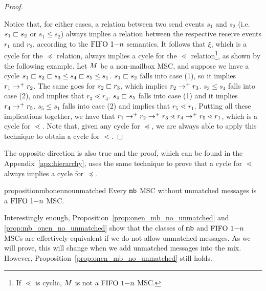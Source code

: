 \begin{proof}
\begin{enumerate}
\end{enumerate}
Notice that, for either cases, a relation between two send events $s_1$ and $s_2$ (i.e. $s_1 \sqsubset s_2$ or $s_1 \le s_2$) always implies a relation between the respective receive events $r_1$ and $r_2$, according to the $\text{FIFO } 1\mathsf{-}n$ semantics. It follows that $\xi$, which is a cycle for the $\preceq$ relation, always implies a cycle for the $\lessdot$ relation\footnote{If $\lessdot$ is cyclic, $M$ is not a $\text{FIFO } 1\mathsf{-}n$ MSC.}, as shown by the following example. Let $M$ be a non-mailbox MSC, and suppose we have a cycle $s_1 \sqsubset s_2 \sqsubset s_3 \le s_4 \sqsubset s_5 \le s_1$. $s_1 \sqsubset s_2$ falls into case (1), so it implies $r_1 \to^+ r_2$. The same goes for $s_2 \sqsubset r_3$, which implies $r_2 \to^+ r_3$. $s_3 \le s_4$ falls into case (2), and implies that $r_3 \lessdot r_4$. $s_4 \sqsubset s_5$ falls into case (1) and it implies $r_4 \to^+ r_5$. $s_5 \le s_1$ falls into case (2) and implies that $r_5 \lessdot r_1$. Putting all these implications together, we have that $r_1 \to^+ r_2 \to^+ r_3 \lessdot r_4 \to^+ r_5 \lessdot r_1$, which is a cycle for $\lessdot$. Note that, given any cycle for $\preceq$, we are always able to apply this technique to obtain a cycle for $\lessdot$.
\end{proof}

The opposite direction is also true and the proof, which can be found in the Appendix~\ref{apx:hierarchy}, uses the same technique to prove that a cycle for $\lessdot$ always implies a cycle for $\preceq$.

\begin{restatable}{proposition}{mbonennounmatched} 
\label{prop:mb_onen_no_unmatched}
	Every $\mathtt{mb}$ MSC without unmatched messages is a $\text{FIFO } 1\mathsf{-}n$ MSC.
\end{restatable}

Interestingly enough, Proposition~\ref{prop:onen_mb_no_unmatched} and \ref{prop:mb_onen_no_unmatched} show that the classes of $\mathtt{mb}$ and $\text{FIFO } 1\mathsf{-}n$ MSCs are effectively equivalent if we do not allow unmatched messages. As we will prove, this will change when we add unmatched messages into the mix. However, Proposition~\ref{prop:onen_mb_no_unmatched} still holds.

